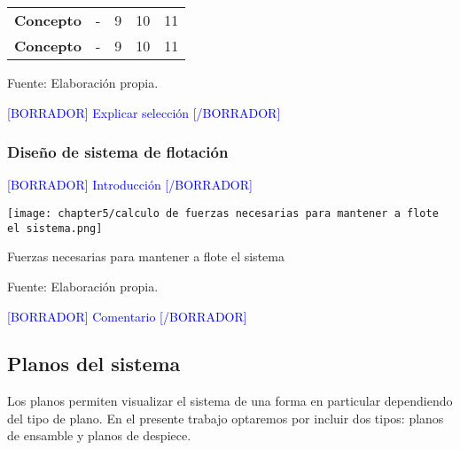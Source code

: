 \begin{mytable}[H]
\begin{tabular}{l|c|c|c|c|}
\begin{minipage}{\mythirdmaxsizeofcontenttable}
		\end{minipage}  \\ \hline
		\multicolumn{1}{|l|}{
			\begin{minipage}{\myforthmaxsizeofcontenttable}			
				\textbf{Concepto}
			\end{minipage}
		} & - & 9 & 10 & 11 \\ \hline
		\multicolumn{1}{|l|}{
			\begin{minipage}{\myforthmaxsizeofcontenttable}			
				\textbf{Concepto}
			\end{minipage}
		} & - & 9 & 10 & 11 \\ \hline
	
	\end{tabular}
	\begin{flushleft}	
		Fuente: Elaboración propia.
	\end{flushleft}
\end{mytable}

\textcolor{blue}{[BORRADOR] Explicar selección [/BORRADOR]} 

\subsubsection{Diseño de sistema de flotación}

\textcolor{blue}{[BORRADOR] Introducción [/BORRADOR]} 

\begin{myfigure}[H]
	\centering
	\texttt{[image: chapter5/calculo de fuerzas necesarias para mantener a flote el sistema.png]}
	\caption{Fuerzas necesarias para mantener a flote el sistema}
	\begin{myflushleftportland}
		Fuente: Elaboración propia.
	\end{myflushleftportland}
	\label{fig:calculo de fuerzas necesarias para mantener a flote el sistema}
\end{myfigure}

\textcolor{blue}{[BORRADOR] Comentario [/BORRADOR]} 

\subsection{Planos del sistema}
\label{ssec:planos del sistema}

Los planos permiten visualizar el sistema de una forma en particular dependiendo del tipo de plano. En el presente trabajo optaremos por incluir dos tipos: planos de ensamble y planos de despiece.

